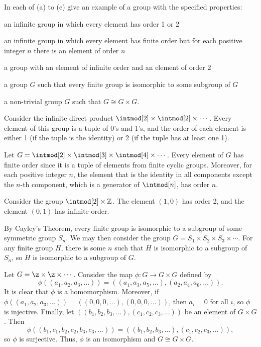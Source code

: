 \begin{exercise}\label{ex5.1.18}
    In each of (a) to (e) give an example of a group with the specified properties:
    \begin{subproblems}
        \item an infinite group in which every element has order 1 or 2
        \item an infinite group in which every element has finite order but for each positive integer $n$ there is an element of order $n$
        \item a group with an element of infinite order and an element of order 2
        \item a group $G$ such that every finite group is isomorphic to some subgroup of $G$
        \item a non-trivial group $G$ such that $G \cong G \times G$.
    \end{subproblems}
\end{exercise}

\begin{solalph}
    \item Consider the infinite direct product $\intmod[2] \times \intmod[2] \times \cdots$. Every element of this group is a tuple of 0's and 1's, and the order of each element is either 1 (if the tuple is the identity) or 2 (if the tuple has at least one 1).
    \item Let $G = \intmod[2] \times \intmod[3] \times \intmod[4] \times \cdots$. Every element of $G$ has finite order since it is a tuple of elements from finite cyclic groups. Moreover, for each positive integer $n$, the element that is the identity in all components except the $n$-th component, which is a generator of $\intmod[n]$, has order $n$.
    \item Consider the group $\intmod[2] \times \mathbb{Z}$. The element $(1, 0)$ has order 2, and the element $(0, 1)$ has infinite order.
    \item By Cayley's Theorem, every finite group is isomorphic to a subgroup of some symmetric group $S_n$. We may then consider the group $G = S_1 \times S_2 \times S_3 \times \cdots$. For any finite group $H$, there is some $n$ such that $H$ is isomorphic to a subgroup of $S_n$, so $H$ is isomorphic to a subgroup of $G$.
    \item Let $G = \z \times \z \times \cdots$. Consider the map $\phi : G \to G \times G$ defined by
    \[\phi((a_1, a_2, a_3, \ldots)) = ((a_1, a_3, a_5, \ldots), (a_2, a_4, a_6, \ldots)).\]
    It is clear that $\phi$ is a homomorphism. Moreover, if $\phi((a_1, a_2, a_3, \ldots)) = ((0, 0, 0, \ldots), (0, 0, 0, \ldots))$, then $a_i = 0$ for all $i$, so $\phi$ is injective. Finally, let $((b_1, b_2, b_3, \ldots), (c_1, c_2, c_3, \ldots))$ be an element of $G \times G$. Then 
    \[\phi((b_1, c_1, b_2, c_2, b_3, c_3, \ldots)) = ((b_1, b_2, b_3, \ldots), (c_1, c_2, c_3, \ldots)),\]
    so $\phi$ is surjective. Thus, $\phi$ is an isomorphism and $G \cong G \times G$.
\end{solalph}


